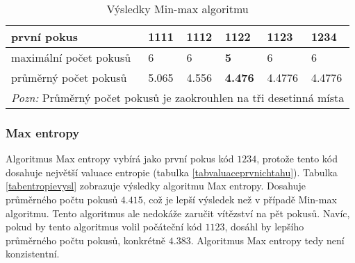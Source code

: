 
\begin{table}[h]
\centering
\begin{tabular}{l l l l l l}
\toprule
první pokus & 1111 & 1112 & \textbf{1122} & 1123 & 1234 \\
\midrule

maximální počet pokusů 
& 6 & 6 & \textbf{5} & 6 & 6 \\

průměrný počet pokusů 
& 5.065 & 4.556 & \textbf{4.476} & 4.4776 & 4.4776\\
\bottomrule
\multicolumn{6}{l}{\footnotesize \textit{Pozn:}
Průměrný počet pokusů je zaokrouhlen na tři desetinná místa}
\end{tabular}
\caption{Výsledky Min-max algoritmu}\label{tabminmaxvysl}
\end{table}

\subsubsection{Max entropy}
Algoritmus Max entropy vybírá jako první pokus kód $1234$, protože tento kód dosahuje největší valuace entropie (tabulka \ref{tabvaluaceprvnichtahu}). Tabulka \ref{tabentropievysl} zobrazuje výsledky algoritmu Max entropy. Dosahuje průměrného počtu pokusů $4.415$, což je lepší výsledek než v případě Min-max algoritmu. Tento algoritmus ale nedokáže zaručit vítězství na pět pokusů. Navíc, pokud by tento algoritmus volil počáteční kód $1123$, dosáhl by lepšího průměrného počtu pokusů, konkrétně $4.383$. Algoritmus Max entropy tedy není konzistentní. 


